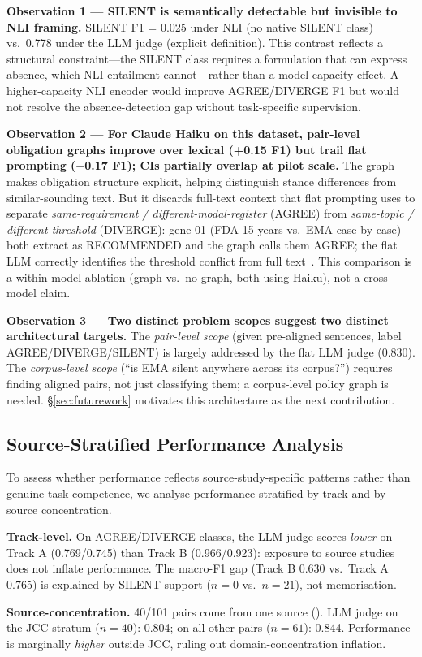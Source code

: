 \documentclass[manuscript]{acmart}
\begin{document}
\textbf{Observation 1 --- SILENT is semantically detectable but invisible to
NLI framing.} SILENT F1 = 0.025 under NLI (no native SILENT class) vs.\ 0.778
under the LLM judge (explicit definition). This contrast reflects a structural
constraint---the SILENT class requires a formulation that can express absence,
which NLI entailment cannot---rather than a model-capacity effect. A
higher-capacity NLI encoder would improve AGREE/DIVERGE F1 but would not
resolve the absence-detection gap without task-specific supervision.

\textbf{Observation 2 --- For Claude Haiku on this dataset, pair-level
obligation graphs improve over lexical (+0.15 F1) but trail flat prompting
($-$0.17 F1); CIs partially overlap at pilot scale.} The graph makes
obligation structure explicit, helping distinguish stance differences from
similar-sounding text. But it discards full-text context that flat prompting
uses to separate \textit{same-requirement / different-modal-register} (AGREE)
from \textit{same-topic / different-threshold} (DIVERGE): gene-01 (FDA
15 years vs.\ EMA case-by-case) both extract as RECOMMENDED and the graph
calls them AGREE; the flat LLM correctly identifies the threshold conflict from
full text~\citep{yoran2024robust}. This comparison is a within-model
ablation (graph vs.\ no-graph, both using Haiku), not a cross-model claim.

\textbf{Observation 3 --- Two distinct problem scopes suggest two distinct
architectural targets.} The \textit{pair-level scope} (given pre-aligned
sentences, label AGREE/DIVERGE/SILENT) is largely addressed by the flat LLM
judge (0.830). The \textit{corpus-level scope} (``is EMA silent anywhere
across its corpus?'') requires finding aligned pairs, not just classifying
them; a corpus-level policy graph is needed. \S\ref{sec:futurework} motivates
this architecture as the next contribution.

\subsection{Source-Stratified Performance Analysis}
\label{sec:source_stratified}

\begin{revblock}
To assess whether performance reflects source-study-specific patterns rather
than genuine task competence, we analyse performance stratified by track and
by source concentration.

\textbf{Track-level.} On AGREE/DIVERGE classes, the LLM judge scores
\textit{lower} on Track A (0.769/0.745) than Track B (0.966/0.923): exposure
to source studies does not inflate performance. The macro-F1 gap (Track B 0.630
vs.\ Track A 0.765) is explained by SILENT support ($n = 0$ vs.\ $n = 21$),
not memorisation.

\textbf{Source-concentration.} 40/101 pairs come from one source
(\citeauthor{uc2025jcc}). LLM judge on the JCC stratum ($n = 40$): 0.804;
on all other pairs ($n = 61$): 0.844. Performance is marginally
\textit{higher} outside JCC, ruling out domain-concentration inflation.
\end{revblock}
\end{document}
